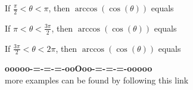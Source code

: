 \documentclass{ximera}
\begin{document}
\begin{question}


If $\frac{\pi}{2} < \theta < \pi$, then $\arccos(\cos(\theta))$ equals

\begin{multipleChoice}
\choice[correct] {$\theta$}
\choice {$\pi - \theta$}
\choice {$\pi + \theta$}
\choice {$2\pi - \theta$}
\end{multipleChoice}

\end{question}






\begin{question}


If $\pi < \theta < \frac{3\pi}{2}$, then $\arccos(\cos(\theta))$ equals

\begin{multipleChoice}
\choice {$\theta$}
\choice {$\pi - \theta$}
\choice {$\pi + \theta$}
\choice[correct] {$2\pi - \theta$}
\end{multipleChoice}

\end{question}






\begin{question}


If $\frac{3\pi}{2} < \theta < 2\pi$, then $\arccos(\cos(\theta))$ equals

\begin{multipleChoice}
\choice {$\theta$}
\choice {$\pi - \theta$}
\choice {$\pi + \theta$}
\choice[correct] {$2\pi - \theta$}
\end{multipleChoice}

\end{question}









\begin{onlineOnly}
\begin{center}
\textbf{\textcolor{green!50!black}{ooooo-=-=-=-ooOoo-=-=-=-ooooo}} \\

more examples can be found by following this link\\ 

\end{center}
\end{onlineOnly}
\end{document}
